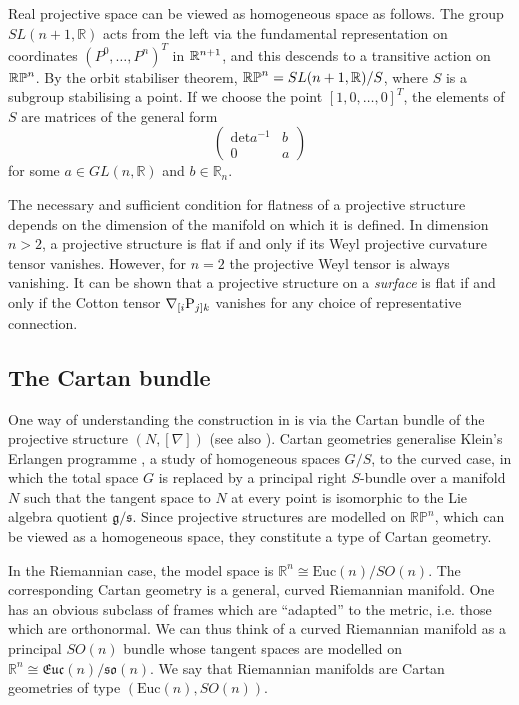 \begin{rmk}
Real projective space can be viewed as homogeneous space as follows. 
The group $SL(n+1,\mathbb{R})$ acts from the left via the fundamental representation on coordinates $(P^0,\dots,P^n)^T$ in $\mathbb{R}^{n+1}$, and this descends to a transitive action on $\mathbb{RP}^n$. By the orbit stabiliser theorem, $\mathbb{RP}^n=SL(n+1,\mathbb{R})/S$, where $S$ is a subgroup stabilising a point. If we choose the point $[1,0,\dots,0]^T$, the elements of $S$ are matrices of the general form
\[
\begin{pmatrix}\mathrm{det}a^{-1} & b\\
0 & a
\end{pmatrix}
\]
for some $a\in GL(n,\mathbb{R})$ and $b\in\mathbb{R}_{n}$.
\end{rmk} 

\begin{rmk}
The necessary and sufficient condition for flatness of a projective structure depends on the dimension of the manifold on which it is defined. In dimension $n>2$, a projective structure is flat if and only if its Weyl projective curvature tensor vanishes. However, for $n=2$ the projective Weyl tensor is always vanishing. It can be shown that a projective structure on a \textit{surface} is flat if and only if the Cotton tensor $\nabla_{[i}\mathrm{P}_{j]k}$ vanishes for any choice of representative connection.
\end{rmk}

\subsection{The Cartan bundle}

One way of understanding the construction in \cite{DM}
is via the Cartan bundle \cite{Cartan} of the projective structure $(N,[\nabla])$ (see also \cite{KobNag,Sharpe}). Cartan geometries generalise Klein's Erlangen programme \cite{Klein}, a study of homogeneous spaces $G/S$, to the curved case, in which the total space $G$ is replaced by a principal right $S$-bundle over a manifold $N$ such that the tangent space to $N$ at every point is isomorphic to the Lie algebra quotient $\mathfrak{g}/\mathfrak{s}$. Since projective structures are modelled on $\mathbb{RP}^{n}$, which can be viewed as a homogeneous space, they constitute a type of Cartan geometry.

In the Riemannian case, the model space is $\mathbb{R}^{n}\cong\mathrm{Euc}(n)/SO(n)$. The corresponding Cartan geometry is a general, curved Riemannian manifold. One has an obvious subclass of frames which are ``adapted'' to the metric, i.e. those which are orthonormal. We can thus think of a curved Riemannian manifold as a principal $SO(n)$ bundle whose tangent spaces are modelled on $\mathbb{R}^{n}\cong\mathfrak{Euc}(n)/\mathfrak{so}(n)$. We say that Riemannian manifolds are Cartan geometries of type $(\mathrm{Euc}(n),SO(n))$.

